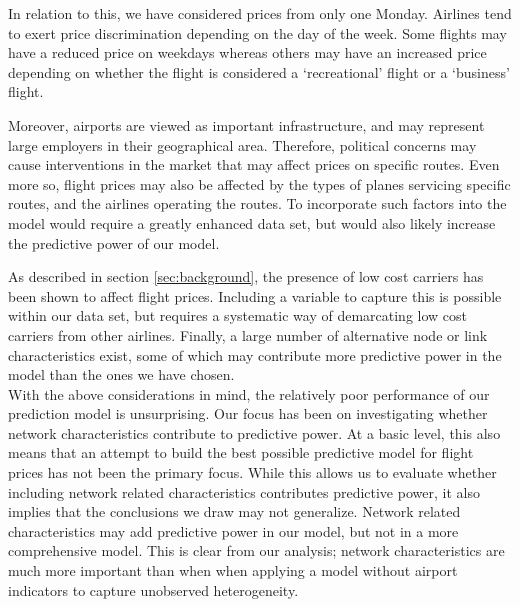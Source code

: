 \par
In relation to this, we have considered prices from only one Monday. Airlines tend to exert price discrimination depending on the day of the week. Some flights may have a reduced price on weekdays whereas others may have an increased price depending on whether the flight is considered a `recreational' flight or a `business' flight. 
\par
Moreover, airports are viewed as important infrastructure, and may represent large employers in their geographical area. Therefore, political concerns may cause interventions in the market that may affect prices on specific routes. Even more so, flight prices may also be affected by the types of planes servicing specific routes, and the airlines operating the routes. To incorporate such factors into the model would require a greatly enhanced data set, but would also likely increase the predictive power of our model.
\par
As described in section \ref{sec:background}, the presence of low cost carriers has been shown to affect flight prices. Including a variable to capture this is possible within our data set, but requires a systematic way of demarcating low cost carriers from other airlines. 
Finally, a large number of alternative node or link characteristics exist, some of which may contribute more predictive power in the model than the ones we have chosen. 
\medskip\\
With the above considerations in mind, the relatively poor performance of our prediction model is unsurprising. Our focus has been on investigating whether network characteristics contribute to predictive power. At a basic level, this also means that an attempt to build the best possible predictive model for flight prices has not been the primary focus. While this allows us to evaluate whether including network related characteristics contributes predictive power, it also implies that the conclusions we draw may not generalize. Network related characteristics may add predictive power in our model, but not in a more comprehensive model. This is clear from our analysis; network characteristics are much more important than when when applying a model without airport indicators to capture unobserved heterogeneity.